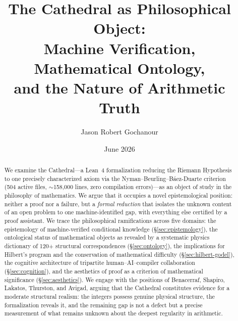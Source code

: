 \documentclass[11pt,a4paper]{article}
\title{%
  The Cathedral as Philosophical Object:\\
  Machine Verification, Mathematical Ontology,\\
  and the Nature of Arithmetic Truth%
}
\author{Jason Robert Gochanour}
\date{June 2026}
\begin{document}
\maketitle

\begin{abstract}
We examine the Cathedral---a Lean~4 formalization reducing the
Riemann Hypothesis to one precisely characterized axiom via the
Nyman--Beurling--B\'aez-Duarte criterion (504 active files,
$\sim$158{,}000 lines, zero compilation errors)---as an object of
study in the philosophy of mathematics. We argue that it occupies
a novel epistemological position: neither a proof nor a failure,
but a \emph{formal reduction} that isolates the unknown content of
an open problem to one machine-identified gap,
with everything else certified by a proof assistant. We trace the
philosophical ramifications across five domains: the epistemology
of machine-verified conditional knowledge (\S\ref{sec:epistemology}),
the ontological status of mathematical objects as revealed by a
systematic physics dictionary of 120+ structural correspondences
(\S\ref{sec:ontology}), the implications for Hilbert's program and
the conservation of mathematical difficulty
(\S\ref{sec:hilbert-godel}), the cognitive architecture of
tripartite human--AI--compiler collaboration
(\S\ref{sec:cognition}), and the aesthetics of proof as a
criterion of mathematical significance (\S\ref{sec:aesthetics}).
We engage with the positions of Benacerraf, Shapiro, Lakatos,
Thurston, and Avigad, arguing that the Cathedral constitutes
evidence for a moderate structural realism: the integers possess
genuine physical structure, the formalization reveals it, and the
remaining gap is not a defect but a precise measurement of what
remains unknown about the deepest regularity in arithmetic.
\end{abstract}

\tableofcontents
















\end{document}
